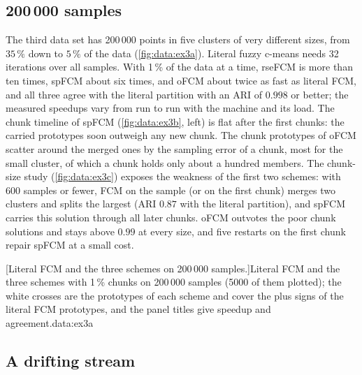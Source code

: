 \subsection{200\,000 samples}

The third data set has 200\,000 points in five clusters of very different sizes, from $35\,\%$ down to $5\,\%$ of the data (\cref{fig:data:ex3a}). Literal fuzzy c-means needs 32 iterations over all samples. With 1\,\% of the data at a time, rseFCM is more than ten times, spFCM about six times, and oFCM about twice as fast as literal FCM, and all three agree with the literal partition with an ARI of $0.998$ or better; the measured speedups vary from run to run with the machine and its load. The chunk timeline of spFCM (\cref{fig:data:ex3b}, left) is flat after the first chunks: the carried prototypes soon outweigh any new chunk. The chunk prototypes of oFCM scatter around the merged ones by the sampling error of a chunk, most for the small cluster, of which a chunk holds only about a hundred members. The chunk-size study (\cref{fig:data:ex3c}) exposes the weakness of the first two schemes: with 600 samples or fewer, FCM on the sample (or on the first chunk) merges two clusters and splits the largest (ARI $0.87$ with the literal partition), and spFCM carries this solution through all later chunks. oFCM outvotes the poor chunk solutions and stays above $0.99$ at every size, and five restarts on the first chunk repair spFCM at a small cost.

[Literal FCM and the three schemes on 200\,000 samples.]{Literal FCM and the three schemes with 1\,\% chunks on 200\,000 samples (5000 of them plotted); the white crosses are the prototypes of each scheme and cover the plus signs of the literal FCM prototypes, and the panel titles give speedup and agreement.}{data:ex3a}

\subsection{A drifting stream}

